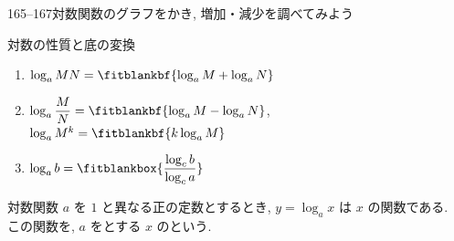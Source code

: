 \documentclass[14pt,dvipdfmx]{jsarticle}
\begin{document}
  {165--167}{対数関数のグラフをかき, 増加・減少を調べてみよう}

\setcounter{definition}{1}
\setcounter{theorem}{5}

\vspace{-2.2zw}%
\enlargethispage{5zw}%
\vspace{-0.25em}
\begin{reviewbox}{対数の性質と底の変換}
  \begin{enumerate}[label=\textbf{\arabic*}, leftmargin=1.5zw, itemsep=0.02em]
    \item $\log_{a} MN = \fitblankbf{\log_{a} M + \log_{a} N}$
    \item $\log_{a} \dfrac{M}{N} = \fitblankbf{\log_{a} M - \log_{a} N}$,\quad
          $\log_{a} M^{k} = \fitblankbf{k \log_{a} M}$
    \item $\log_{a} b = \fitblankbox{\dfrac{\log_{c} b}{\log_{c} a}}$
  \end{enumerate}
\end{reviewbox}

\begin{definitionbox}{対数関数}
  $a$ を $1$ と異なる正の定数とするとき, $y=\log_{a} x$ は $x$ の関数である.\\
  この関数を, $a$ をとする $x$ のという.
\end{definitionbox}
\end{document}
